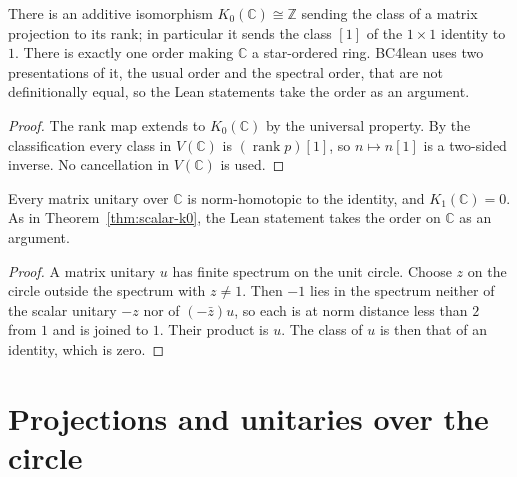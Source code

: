 \begin{theorem}\label{thm:scalar-k0}
\leanok
There is an additive isomorphism $K_0(\mathbb C)\cong\mathbb Z$ sending the
class of a matrix projection to its rank; in particular it sends the class
$[1]$ of the $1\times1$ identity to $1$. There is exactly one order making
$\mathbb C$ a star-ordered ring. BC4lean uses two presentations of it, the
usual order and the spectral order, that are not definitionally equal, so the
Lean statements take the order as an argument.
\end{theorem}
\begin{proof}
\leanok
The rank map extends to $K_0(\mathbb C)$ by the universal property. By the
classification every class in $V(\mathbb C)$ is $(\operatorname{rank}p)[1]$,
so $n\mapsto n[1]$ is a two-sided inverse. No cancellation in $V(\mathbb C)$
is used.
\end{proof}

\begin{theorem}\label{thm:scalar-k1}
\leanok
Every matrix unitary over $\mathbb C$ is norm-homotopic to the identity, and
$K_1(\mathbb C)=0$. As in Theorem~\ref{thm:scalar-k0}, the Lean statement takes
the order on $\mathbb C$ as an argument.
\end{theorem}
\begin{proof}
\leanok
A matrix unitary $u$ has finite spectrum on the unit circle. Choose $z$ on the
circle outside the spectrum with $z\neq1$. Then $-1$ lies in the spectrum
neither of the scalar unitary $-z$ nor of $(-\bar z)u$, so each is at norm
distance less than $2$ from $1$ and is joined to $1$. Their product is $u$.
The class of $u$ is then that of an identity, which is zero.
\end{proof}

\section{Projections and unitaries over the circle}


